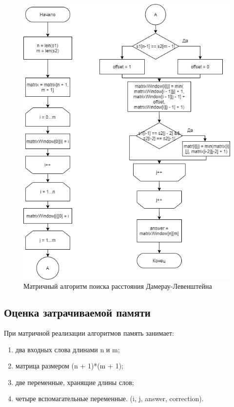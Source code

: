 \documentclass{article}
\begin{document}
	 	\begin{figure}
		 	\includegraphics[scale=0.9]{DamerauLevenshtainMatrix}
		 	\caption{Матричный алгоритм поиска расстояния Дамерау-Левенштейна}
		 	\label{DamerauLevenshtainMatrix}
	 	\end{figure}
	 	\newpage
		 \subsection{Оценка затрачиваемой памяти}
		 При матричной реализации алгоритмов память занимает:
		 \begin{enumerate}
 		 	\item два входных слова длинами n и m;	
		 	\item матрица размером (n + 1)*(m + 1);
		 	\item две переменные, хранящие длины слов;
		 	\item четыре вспомагательные переменные. (i, j, answer, correction).
		 \end{enumerate}
	 	
\end{document}
